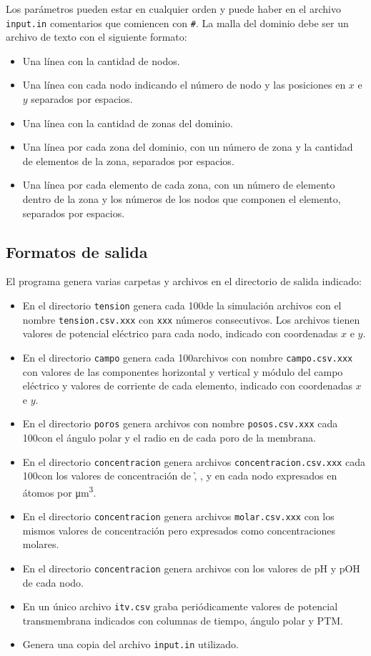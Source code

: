 Los parámetros pueden estar en cualquier orden y puede haber en el archivo \texttt{input.in} comentarios que comiencen con \texttt{\#}. La malla del dominio debe ser un archivo de texto con el siguiente formato:

\begin{itemize}
	\item Una línea con la cantidad de nodos.
	\item Una línea con cada nodo indicando el número de nodo y las posiciones en $x$ e $y$ separados por espacios.
	\item Una línea con la cantidad de zonas del dominio.
	\item Una línea por cada zona del dominio, con un número de zona y la cantidad de elementos de la zona, separados por espacios.
	\item Una línea por cada elemento de cada zona, con un número de elemento dentro de la zona y los números de los nodos que componen el elemento, separados por espacios.
\end{itemize}

\subsection*{Formatos de salida}

El programa genera varias carpetas y archivos en el directorio de salida indicado:

\begin{itemize}
	\item En el directorio \texttt{tension} genera cada 100\usec de la simulación archivos con el nombre \texttt{tension.csv.xxx} con \texttt{xxx} números consecutivos. Los archivos tienen valores de potencial eléctrico para cada nodo, indicado con coordenadas $x$ e $y$.
	\item En el directorio \texttt{campo} genera cada 100\usec archivos con nombre \texttt{campo.csv.xxx} con valores de las componentes horizontal y vertical y módulo del campo eléctrico y valores de corriente de cada elemento, indicado con coordenadas $x$ e $y$.
	\item En el directorio \texttt{poros} genera archivos con nombre \texttt{posos.csv.xxx} cada 100\usec con el ángulo polar y el radio en \um de cada poro de la membrana. 
	\item En el directorio \texttt{concentracion} genera archivos \texttt{concentracion.csv.xxx} cada 100\usec con los valores de concentración de \h, \oh, \na y \cl en cada nodo expresados en átomos por \si{\micro\metre\cubed}.
	\item En el directorio \texttt{concentracion} genera archivos \texttt{molar.csv.xxx} con los mismos valores de concentración pero expresados como concentraciones molares.
	\item En el directorio \texttt{concentracion} genera archivos con los valores de pH y pOH de cada nodo.
	\item En un único archivo \texttt{itv.csv} graba periódicamente valores de potencial transmembrana indicados con columnas de tiempo, ángulo polar y PTM.
	\item Genera una copia del archivo \texttt{input.in} utilizado.
\end{itemize}

